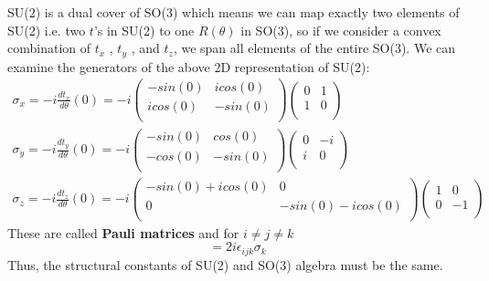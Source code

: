 SU(2) is a dual cover of SO(3) which means we can map exactly two elements of SU(2) i.e. two $t$'s in SU(2) to one $R(\theta)$ in SO(3),
so if we consider a convex combination of $t_x$ , $t_y$ , and $t_z$, we span all elements of the entire SO(3).
We can examine the generators of the above 2D representation of SU(2):
\begin{equation}
    \begin{aligned}
        \sigma_x = -i \frac{dt_x}{d\theta}(0) = 
        -i \begin{pmatrix}
        -sin(0) & icos(0) \\ 
        icos(0) & -sin(0) \\ 
    \end{pmatrix} 
    \begin{pmatrix}
        0 & 1 \\ 
        1 & 0 \\ 
    \end{pmatrix} \\
    \sigma_y = -i \frac{dt_y}{d\theta}(0) = 
        -i \begin{pmatrix}
        -sin(0) & cos(0) \\ 
        -cos(0) & -sin(0) \\ 
    \end{pmatrix} 
    \begin{pmatrix}
        0 & -i \\ 
        i & 0 \\ 
    \end{pmatrix} \\
    \sigma_z = -i \frac{dt_z}{d\theta}(0) = 
        -i \begin{pmatrix}
        -sin(0) + icos(0) & 0\\ 
        0 & -sin(0) - icos(0) \\ 
    \end{pmatrix} 
    \begin{pmatrix}
        1 & 0 \\ 
        0 & -1 \\ 
    \end{pmatrix}
    \end{aligned}
\end{equation}
These are called \textbf{Pauli matrices} and for $i \neq j \neq k$
\begin{equation}
    [\sigma_i, \sigma_j] = 2i\epsilon_{ijk}\sigma_k
\end{equation}
Thus, the structural constants of SU(2) and SO(3) algebra must be the same. 


